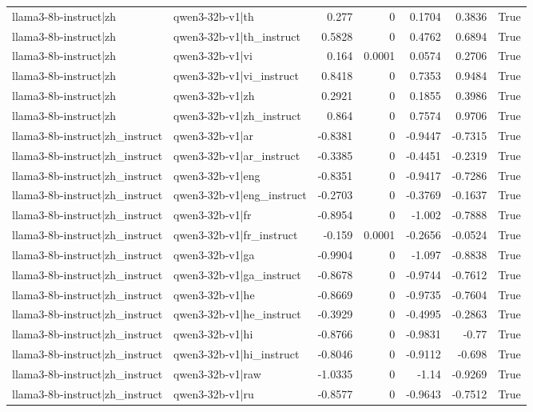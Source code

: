 \begin{table}
\begin{tabular}{l l r r r r l}
llama3-8b-instruct|zh & qwen3-32b-v1|th & 0.277 & 0 & 0.1704 & 0.3836 & True \\
llama3-8b-instruct|zh & qwen3-32b-v1|th_instruct & 0.5828 & 0 & 0.4762 & 0.6894 & True \\
llama3-8b-instruct|zh & qwen3-32b-v1|vi & 0.164 & 0.0001 & 0.0574 & 0.2706 & True \\
llama3-8b-instruct|zh & qwen3-32b-v1|vi_instruct & 0.8418 & 0 & 0.7353 & 0.9484 & True \\
llama3-8b-instruct|zh & qwen3-32b-v1|zh & 0.2921 & 0 & 0.1855 & 0.3986 & True \\
llama3-8b-instruct|zh & qwen3-32b-v1|zh_instruct & 0.864 & 0 & 0.7574 & 0.9706 & True \\
llama3-8b-instruct|zh_instruct & qwen3-32b-v1|ar & -0.8381 & 0 & -0.9447 & -0.7315 & True \\
llama3-8b-instruct|zh_instruct & qwen3-32b-v1|ar_instruct & -0.3385 & 0 & -0.4451 & -0.2319 & True \\
llama3-8b-instruct|zh_instruct & qwen3-32b-v1|eng & -0.8351 & 0 & -0.9417 & -0.7286 & True \\
llama3-8b-instruct|zh_instruct & qwen3-32b-v1|eng_instruct & -0.2703 & 0 & -0.3769 & -0.1637 & True \\
llama3-8b-instruct|zh_instruct & qwen3-32b-v1|fr & -0.8954 & 0 & -1.002 & -0.7888 & True \\
llama3-8b-instruct|zh_instruct & qwen3-32b-v1|fr_instruct & -0.159 & 0.0001 & -0.2656 & -0.0524 & True \\
llama3-8b-instruct|zh_instruct & qwen3-32b-v1|ga & -0.9904 & 0 & -1.097 & -0.8838 & True \\
llama3-8b-instruct|zh_instruct & qwen3-32b-v1|ga_instruct & -0.8678 & 0 & -0.9744 & -0.7612 & True \\
llama3-8b-instruct|zh_instruct & qwen3-32b-v1|he & -0.8669 & 0 & -0.9735 & -0.7604 & True \\
llama3-8b-instruct|zh_instruct & qwen3-32b-v1|he_instruct & -0.3929 & 0 & -0.4995 & -0.2863 & True \\
llama3-8b-instruct|zh_instruct & qwen3-32b-v1|hi & -0.8766 & 0 & -0.9831 & -0.77 & True \\
llama3-8b-instruct|zh_instruct & qwen3-32b-v1|hi_instruct & -0.8046 & 0 & -0.9112 & -0.698 & True \\
llama3-8b-instruct|zh_instruct & qwen3-32b-v1|raw & -1.0335 & 0 & -1.14 & -0.9269 & True \\
llama3-8b-instruct|zh_instruct & qwen3-32b-v1|ru & -0.8577 & 0 & -0.9643 & -0.7512 & True \\

\end{tabular}
\end{table}
